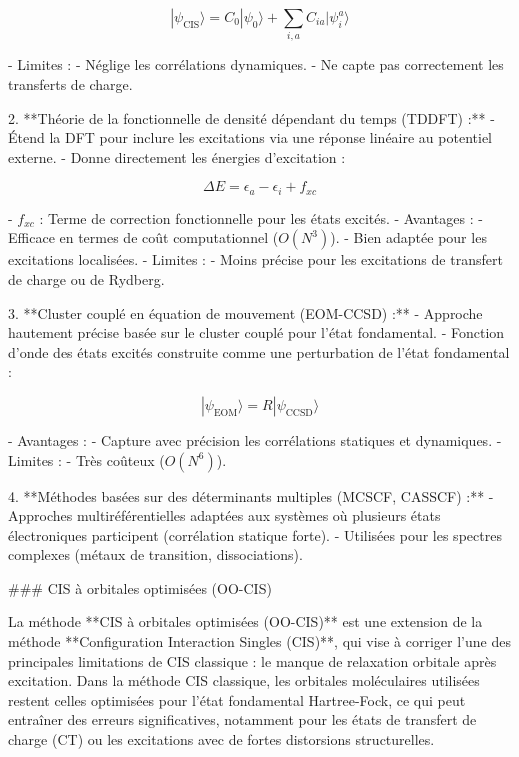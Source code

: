 \documentclass[12pt,a4paper]{report}
\numberwithin{equation}{section}
\numberwithin{figure}{section}
\numberwithin{table}{section}
\begin{document}
\begin{markdown}
\begin{equation}
|\psi_{\text{CIS}}\rangle = C_0 |\psi_0\rangle + \sum_{i,a} C_{ia} |\psi_i^a\rangle
\end{equation}

   - Limites :
     - Néglige les corrélations dynamiques.
     - Ne capte pas correctement les transferts de charge.

2. **Théorie de la fonctionnelle de densité dépendant du temps (TDDFT) :**
   - Étend la DFT pour inclure les excitations via une réponse linéaire au potentiel externe.
   - Donne directement les énergies d'excitation :

\begin{equation}
\Delta E = \epsilon_a - \epsilon_i + f_{xc}
\end{equation}

   - $f_{xc}$ : Terme de correction fonctionnelle pour les états excités.
   - Avantages :
     - Efficace en termes de coût computationnel ($O(N^3)$).
     - Bien adaptée pour les excitations localisées.
   - Limites :
     - Moins précise pour les excitations de transfert de charge ou de Rydberg.

3. **Cluster couplé en équation de mouvement (EOM-CCSD) :**
   - Approche hautement précise basée sur le cluster couplé pour l’état fondamental.
   - Fonction d’onde des états excités construite comme une perturbation de l’état fondamental :

\begin{equation}
|\psi_{\text{EOM}}\rangle = R |\psi_{\text{CCSD}}\rangle
\end{equation}

   - Avantages :
     - Capture avec précision les corrélations statiques et dynamiques.
   - Limites :
     - Très coûteux ($O(N^6)$).

4. **Méthodes basées sur des déterminants multiples (MCSCF, CASSCF) :**
   - Approches multiréférentielles adaptées aux systèmes où plusieurs états électroniques participent (corrélation statique forte).
   - Utilisées pour les spectres complexes (métaux de transition, dissociations).


### CIS à orbitales optimisées (OO-CIS)

La méthode **CIS à orbitales optimisées (OO-CIS)** est une extension de la méthode **Configuration Interaction Singles (CIS)**, qui vise à corriger l'une des principales limitations de CIS classique : le manque de relaxation orbitale après excitation. Dans la méthode CIS classique, les orbitales moléculaires utilisées restent celles optimisées pour l'état fondamental Hartree-Fock, ce qui peut entraîner des erreurs significatives, notamment pour les états de transfert de charge (CT) ou les excitations avec de fortes distorsions structurelles.


\end{markdown}
\end{document}
